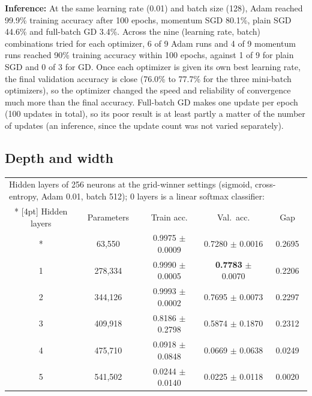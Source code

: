 \documentclass[12pt,a4paper]{article}
\begin{document}
\textbf{Inference:} At the same learning rate (0.01) and batch size (128), Adam reached
99.9\% training accuracy after 100 epochs, momentum SGD
80.1\%, plain SGD 44.6\% and
full-batch GD 3.4\%. Across the nine (learning rate, batch)
combinations tried for each optimizer, 6 of 9 Adam runs and
4 of 9 momentum runs reached 90\% training accuracy within 100
epochs, against 1 of 9 for plain SGD and 0 of 3 for GD. Once each
optimizer is given its own best learning rate, the final validation accuracy is close
(76.0\% to 77.7\% for the three mini-batch
optimizers), so the optimizer changed the speed and reliability of convergence much more than the
final accuracy. Full-batch GD makes one update per epoch (100 updates in total), so its poor
result is at least partly a matter of the number of updates (an inference, since the update count
was not varied separately).

\subsection*{Depth and width}
{\small\setlength{\tabcolsep}{4pt}
\begin{longtable}{ccccc}
\multicolumn{5}{l}{\parbox[t]{14.5cm}{Hidden layers of 256 neurons at the grid-winner settings (sigmoid, cross-entropy, Adam 0.01, batch 512); 0 layers is a linear softmax classifier:}} \\*
[4pt]
\toprule
Hidden layers & Parameters & Train acc. & Val.\ acc. & Gap \\*
\midrule
0 & 63{,}550 & 0.9975 $\pm$ 0.0009 & 0.7280 $\pm$ 0.0016 & 0.2695 \\
1 & 278{,}334 & 0.9990 $\pm$ 0.0005 & \textbf{0.7783} $\pm$ 0.0070 & 0.2206 \\
2 & 344{,}126 & 0.9993 $\pm$ 0.0002 & 0.7695 $\pm$ 0.0073 & 0.2297 \\
3 & 409{,}918 & 0.8186 $\pm$ 0.2798 & 0.5874 $\pm$ 0.1870 & 0.2312 \\
4 & 475{,}710 & 0.0918 $\pm$ 0.0848 & 0.0669 $\pm$ 0.0638 & 0.0249 \\
5 & 541{,}502 & 0.0244 $\pm$ 0.0140 & 0.0225 $\pm$ 0.0118 & 0.0020 \\
\bottomrule
\end{longtable}
}
\end{document}
